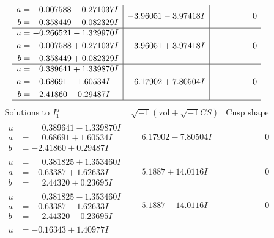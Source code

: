 \documentclass[1p]{elsarticle_modified}
\theoremstyle{definition}
\newcommand{\I}{\sqrt{-1}}
\begin{document}
$$\begin{array}{c|c|c}
\begin{aligned}
a &= \phantom{-}0.007588 - 0.271037 I \\
b &= -0.358449 - 0.082329 I\end{aligned}
 & -3.96051 - 3.97418 I & \phantom{-0.000000 } 0 \\ \hline\begin{aligned}
u &= -0.266521 - 1.329970 I \\
a &= \phantom{-}0.007588 + 0.271037 I \\
b &= -0.358449 + 0.082329 I\end{aligned}
 & -3.96051 + 3.97418 I & \phantom{-0.000000 } 0 \\ \hline\begin{aligned}
u &= \phantom{-}0.389641 + 1.339870 I \\
a &= \phantom{-}0.68691 - 1.60534 I \\
b &= -2.41860 - 0.29487 I\end{aligned}
 & \phantom{-}6.17902 + 7.80504 I & \phantom{-0.000000 } 0\\
 \hline 
 \end{array}$$\newpage$$\begin{array}{c|c|c}  
\text{Solutions to }I^u_{1}& \I (\text{vol} + \sqrt{-1}CS) & \text{Cusp shape}\\
 \hline 
\begin{aligned}
u &= \phantom{-}0.389641 - 1.339870 I \\
a &= \phantom{-}0.68691 + 1.60534 I \\
b &= -2.41860 + 0.29487 I\end{aligned}
 & \phantom{-}6.17902 - 7.80504 I & \phantom{-0.000000 } 0 \\ \hline\begin{aligned}
u &= \phantom{-}0.381825 + 1.353460 I \\
a &= -0.63387 + 1.62633 I \\
b &= \phantom{-}2.44320 + 0.23695 I\end{aligned}
 & \phantom{-}5.1887 + 14.0116 I & \phantom{-0.000000 } 0 \\ \hline\begin{aligned}
u &= \phantom{-}0.381825 - 1.353460 I \\
a &= -0.63387 - 1.62633 I \\
b &= \phantom{-}2.44320 - 0.23695 I\end{aligned}
 & \phantom{-}5.1887 - 14.0116 I & \phantom{-0.000000 } 0 \\ \hline\begin{aligned}
u &= -0.16343 + 1.40977 I \\

\end{aligned}
\end{array}$$
\end{document}
